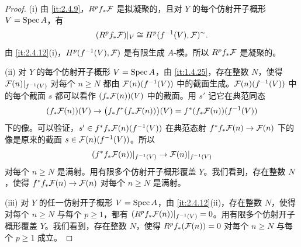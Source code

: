 \begin{proof}
(i) 由 \ref{it:2.4.9}，$R^pf_*\mathcal{F}$ 是拟凝聚的，且对 $Y$ 的每个仿射开子概形 $V=\operatorname{Spec} A$，有
\[
(R^pf_*\mathcal{F})|_V\cong H^p(f^{-1}(V),\mathcal{F})^{\sim}.
\]
由 \ref{it:2.4.12}(i)，$H^p(f^{-1}(V),\mathcal{F})$ 是有限生成 $A$-模。所以 $R^pf_*\mathcal{F}$ 是凝聚的。

(ii) 对 $Y$ 的每个仿射开子概形 $V=\operatorname{Spec} A$，由 \ref{it:1.4.25}，存在整数 $N$，使得 $\mathcal{F}(n)|_{f^{-1}(V)}$ 对每个 $n\ge N$ 都由 $\mathcal{F}(n)(f^{-1}(V))$ 中的截面生成。$\mathcal{F}(n)(f^{-1}(V))$ 中的每个截面 $s$ 都可以看作 $(f_*\mathcal{F}(n))(V)$ 中的截面。用 $s'$ 记它在典范同态
\[
(f_*\mathcal{F}(n))(V)\to\bigl(f_*f^{*}(f_*\mathcal{F}(n))\bigr)(V)=f^{*}(f_*\mathcal{F}(n))(f^{-1}(V))
\]
下的像。可以验证，$s'\in f^{*}f_*\mathcal{F}(n)(f^{-1}(V))$ 在典范态射 $f^{*}f_*\mathcal{F}(n)\to\mathcal{F}(n)$ 下的像是原来的截面 $s\in\mathcal{F}(n)(f^{-1}(V))$。所以
\[
(f^{*}f_*\mathcal{F}(n))|_{f^{-1}(V)}\to\mathcal{F}(n)|_{f^{-1}(V)}
\]
对每个 $n\ge N$ 是满射。用有限多个仿射开子概形覆盖 $Y$。我们看到，存在整数 $N$，使得 $f^{*}f_*\mathcal{F}(n)\to\mathcal{F}(n)$ 对每个 $n\ge N$ 是满射。

(iii) 对 $Y$ 的任一仿射开子概形 $V=\operatorname{Spec} A$，由 \ref{it:2.4.12}(ii)，存在整数 $N$，使得对每个 $n\ge N$ 与每个 $p\ge 1$，都有 $(R^pf_*\mathcal{F}(n))|_{f^{-1}(V)}=0$。用有限多个仿射开子概形覆盖 $Y$。我们看到，存在整数 $N$，使得 $R^pf_*(\mathcal{F}(n))=0$ 对每个 $n\ge N$ 与每个 $p\ge 1$ 成立。
\end{proof}

